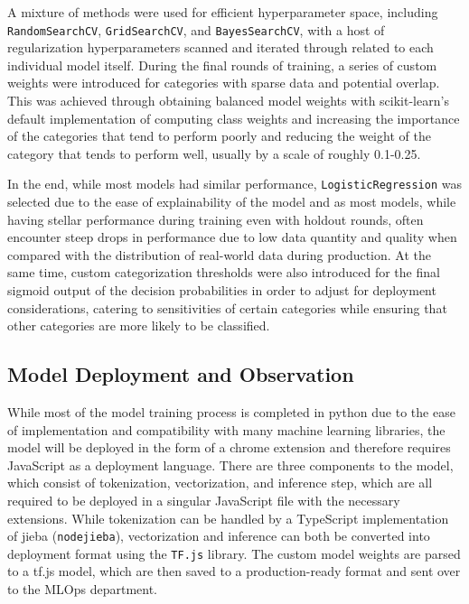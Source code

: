 \documentclass[
  titlepage]{article}
\begin{document}
A mixture of methods were used for efficient hyperparameter space,
including \texttt{RandomSearchCV}, \texttt{GridSearchCV}, and
\texttt{BayesSearchCV}, with a host of regularization hyperparameters
scanned and iterated through related to each individual model itself.
During the final rounds of training, a series of custom weights were
introduced for categories with sparse data and potential overlap. This
was achieved through obtaining balanced model weights with
scikit-learn's default implementation of computing class weights and
increasing the importance of the categories that tend to perform poorly
and reducing the weight of the category that tends to perform well,
usually by a scale of roughly 0.1-0.25.

In the end, while most models had similar performance,
\texttt{LogisticRegression} was selected due to the ease of
explainability of the model and as most models, while having stellar
performance during training even with holdout rounds, often encounter
steep drops in performance due to low data quantity and quality when
compared with the distribution of real-world data during production. At
the same time, custom categorization thresholds were also introduced for
the final sigmoid output of the decision probabilities in order to
adjust for deployment considerations, catering to sensitivities of
certain categories while ensuring that other categories are more likely
to be classified.

\subsection{Model Deployment and
Observation}\label{model-deployment-and-observation}

While most of the model training process is completed in python due to
the ease of implementation and compatibility with many machine learning
libraries, the model will be deployed in the form of a chrome extension
and therefore requires JavaScript as a deployment language. There are
three components to the model, which consist of tokenization,
vectorization, and inference step, which are all required to be deployed
in a singular JavaScript file with the necessary extensions. While
tokenization can be handled by a TypeScript implementation of jieba
(\texttt{nodejieba}), vectorization and inference can both be converted
into deployment format using the \texttt{TF.js} library. The custom
model weights are parsed to a tf.js model, which are then saved to a
production-ready format and sent over to the MLOps department.
\end{document}
